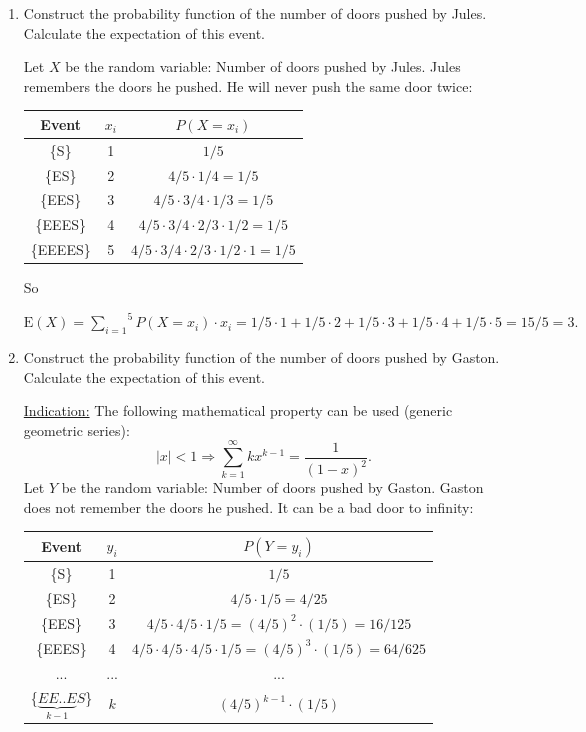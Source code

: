 \documentclass[12pt,thmsa]{article}\usepackage[]{graphicx}\usepackage[]{color}
\begin{document}
\begin{enumerate}%
\item Construct the probability function of the number of doors pushed by Jules. Calculate the expectation of this event.

Let $X$ be the random variable: Number of doors pushed by Jules. Jules remembers the doors he pushed. He will never push the same door twice:

\begin{center}
\begin{tabular}{|c|c|c|}
\hline
Event & $x_i$ & $P(X=x_i)$ \\[1mm]
\hline
\{S\} & 1 & $1/5$\\[1mm]
\hline
\{ES\} & 2 & $4/5\cdot 1/4=1/5$\\[1mm]
\hline
\{EES\} & 3 & $4/5\cdot 3/4\cdot 1/3=1/5$\\[1mm]
\hline
\{EEES\} & 4 & $4/5\cdot 3/4\cdot 2/3\cdot 1/2=1/5$\\[1mm]
\hline
\{EEEES\} & 5 & $4/5\cdot 3/4\cdot 2/3\cdot 1/2\cdot1=1/5$\\[1mm]
\hline
\end{tabular}
\end{center}

So
\begin{center}
$\mbox{E}(X) = \overset{5}{\underset{i=1}{\sum}}P(X=x_i)\cdot x_i = 1/5\cdot1+1/5\cdot2+1/5\cdot3+1/5\cdot4+1/5\cdot5=15/5=3. $
\end{center}

\item Construct the probability function of the number of doors pushed by Gaston. Calculate the expectation of this event.

\noindent \underline{Indication:} The following mathematical property can be used (generic geometric series):
$$|x|<1 \Rightarrow \sum_{k=1}^{\infty} k x^{k-1} = \frac{1}{(1-x)^2}.$$
Let $ Y $ be the random variable: Number of doors pushed by Gaston. Gaston does not remember the doors he pushed. It can be a bad door to infinity:
\begin{center}
\begin{tabular}{|c|c|c|}
\hline
Event & $y_i$ & $P(Y=y_i)$ \\[1mm]
\hline
\{S\} & 1 & $1/5$\\[1mm]
\hline
\{ES\} & 2 & $4/5\cdot 1/5=4/25$\\[1mm]
\hline
\{EES\} & 3 & $4/5\cdot 4/5\cdot 1/5=(4/5)^2\cdot(1/5)=16/125$\\[1mm]
\hline
\{EEES\} & 4 & $4/5\cdot 4/5\cdot 4/5\cdot 1/5=(4/5)^3\cdot(1/5)=64/625 $\\[1mm]
\hline
... & ... & ... \\[1mm]
\hline
\{$\underset{k-1}{\underbrace{EE..E}}S$\} & $k$ & $(4/5)^{k-1}\cdot(1/5)$\\[1mm]
\hline
\end{tabular}
\end{center}


\end{enumerate}
\end{document}
